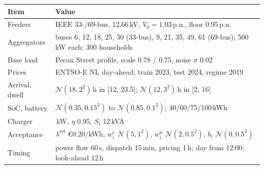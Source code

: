 \begin{tabular}{@{}l>{\raggedright\arraybackslash}p{}@{}}
\toprule
Item & Value \\
\midrule
Feeders & IEEE 33-/69-bus, 12.66\,kV, $V_0=1.03$\,p.u., floor 0.95\,p.u. \\
Aggregators & buses 6, 12, 18, 25, 30 (33-bus), 9, 21, 35, 49, 61 (69-bus); 500\,kW each; 300 households \\
Base load & Pecan Street profile, scale 0.78 / 0.75, noise $\sigma$ 0.02 \\
Prices & ENTSO-E NL day-ahead; train 2023, test 2024, regime 2019 \\
Arrival, dwell & $\mathcal{N}(18, 2^2)$\,h in [12, 23.5]; $\mathcal{N}(12, 3^2)$\,h in [2, 16] \\
SoC, battery & $\mathcal{N}(0.35, 0.15^2)$ to $\mathcal{N}(0.85, 0.1^2)$; 40/60/75/100\,kWh \\
Charger & 11\,kW, $\eta$ 0.95, $S_i$ 12\,kVA \\
Acceptance & $\lambda^{\mathrm{ref}}$ \euro0.20/kWh, $w^{\mathrm{c}}_i$ $\mathcal{N}(5, 1^2)$, $w^{\mathrm{n}}_i$ $\mathcal{N}(2, 0.5^2)$, $b_i$ $\mathcal{N}(0, 0.5^2)$ \\
Timing & power flow 60\,s, dispatch 15\,min, pricing 1\,h; day from 12:00; look-ahead 12\,h \\
\bottomrule
\end{tabular}
